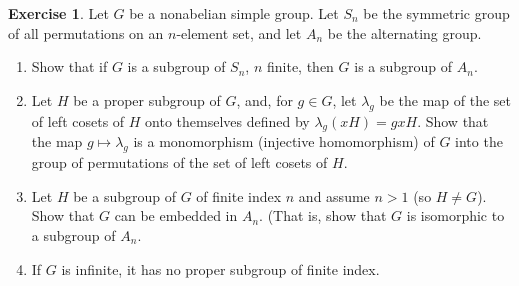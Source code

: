 \documentclass[12pt]{article}
\theoremstyle{plain}
\theoremstyle{definition}
\newtheorem{exercise}{Exercise}
\theoremstyle{remark}
\theoremstyle{remark}
\numberwithin{theorem}{section}
\numberwithin{equation}{section}
\newcommand{\<}{\ensuremath{\langle}}
\renewcommand{\>}{\ensuremath{\rangle}}
\begin{document}
  \begin{exercise}
    Let $G$ be a nonabelian simple group.  Let $S_n$ be the symmetric group of all
  permutations on an $n$-element set, and let $A_n$ be the alternating group.
    \begin{enumerate}
    \item 
      Show that if $G$ is a subgroup of $S_n$, $n$ finite, then $G$ is a subgroup
      of $A_n$.
    \item Let $H$ be a proper subgroup of $G$, and, for $g\in G$, let $\lambda_g$ be
      the map of the set of left cosets of $H$ onto themselves defined by
      $\lambda_g(xH) = gxH$.  
      Show that the map $g\mapsto \lambda_g$ is a monomorphism (injective
      homomorphism) of $G$ into the group of permutations of the set of left
      cosets of $H$. 
    \item Let $H$ be a subgroup of $G$ of finite index $n$  and assume $n>1$ (so $H \neq G$).  
      Show that $G$ can be embedded in $A_n$. (That is, show that $G$ is
      isomorphic to a subgroup of $A_n$.
    \item If $G$ is infinite, it has no proper subgroup of finite index.
    \end{enumerate}
  \end{exercise}
\end{document}
